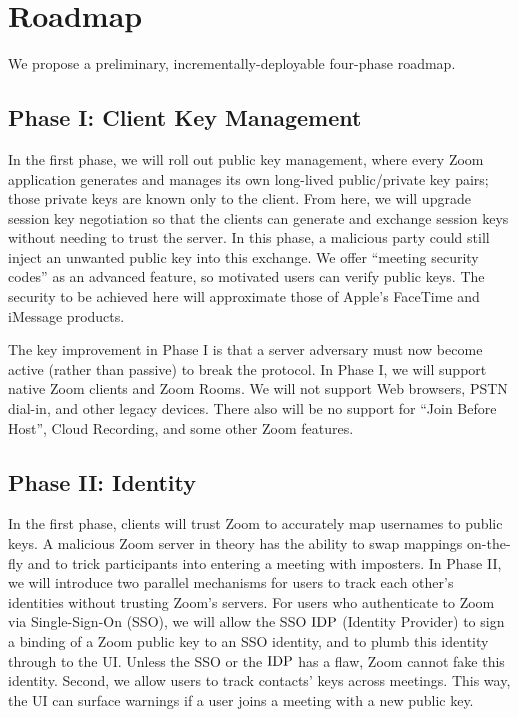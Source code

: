 \section{Roadmap}
We propose a preliminary, incrementally-deployable four-phase roadmap.

\subsection{Phase I: Client Key Management}
In the first phase, we will roll out public key management, where every Zoom application generates and manages its own long-lived public/private key pairs; those private keys are known only to the client. From here, we will upgrade session key negotiation so that the clients can generate and exchange session keys without needing to trust the server. In this phase, a malicious party could still inject an unwanted public key into this exchange. We offer ``meeting security codes'' as an advanced feature, so motivated users can verify public keys. The security to be achieved here will approximate those of Apple's FaceTime and iMessage products.

The key improvement in Phase I is that a server adversary must now become active (rather than passive) to break the protocol. In Phase I, we will support native Zoom clients and Zoom Rooms. We will not support Web browsers, PSTN dial-in, and other legacy devices. There also will be no support for ``Join Before Host'', Cloud Recording, and some other Zoom features.

\subsection{Phase II: Identity}
In the first phase, clients will trust Zoom to accurately map usernames to public keys. A malicious Zoom server in theory has the ability to swap mappings on-the-fly and to trick participants into entering a meeting with imposters. In Phase II, we will introduce two parallel mechanisms for users to track each other's identities without trusting Zoom's servers.  For users who authenticate to Zoom via Single-Sign-On (SSO), we will allow the SSO $\mathrm{IDP}$ (Identity Provider) to sign a binding of a Zoom public key to an SSO identity, and to plumb this identity through to the UI. Unless the SSO or the $\mathrm{IDP}$ has a flaw, Zoom cannot fake this identity. Second, we allow users to track contacts' keys across meetings. This way, the UI can surface warnings if a user joins a meeting with a new public key. 

